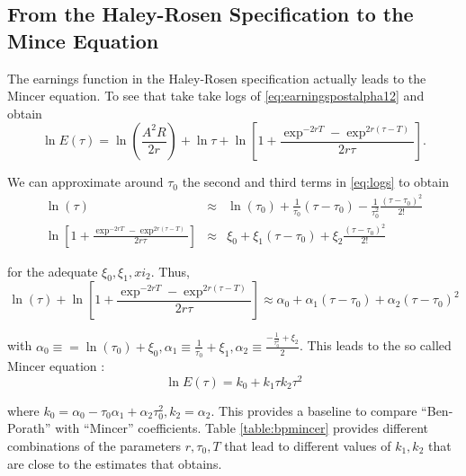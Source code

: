 \subsection{From the Haley-Rosen Specification to the Mince Equation}
The earnings function in the Haley-Rosen specification actually leads to the Mincer equation. To see that take take logs of \eqref{eq:earningspostalpha12} and obtain
\begin{equation}
\ln E(\tau) = \ln \left( \frac{A^2 R}{ 2r} \right) + \ln \tau + \ln \left[ 1 + \frac{\exp^{-2rT} - \exp^{2r(\tau - T)} }{2r \tau} \right]. \label{eq:logs}
\end{equation}

\indent We can approximate around $\tau_{0}$ the second and third terms in \eqref{eq:logs} to obtain
\begin{eqnarray}
\ln(\tau) &\approx& \ln (\tau_{0}) + \frac{1}{\tau_{0}} \left( \tau - \tau_{0} \right) - \frac{1}{\tau_{0}^2} \frac{\left( \tau - \tau_{0} \right)^2}{2!} \nonumber \\
\ln \left[ 1 + \frac{\exp^{-2rT} - \exp^{2r(\tau - T)} }{2r \tau} \right] &\approx& \xi_{0} + \xi_{1} \left( \tau - \tau_{0} \right) + \xi_{2} \frac{\left( \tau - \tau_{0} \right)^2}{2!}
\end{eqnarray}

\noindent for the adequate $\xi_{0}, \xi_{1}, xi_{2}$. Thus,
\begin{equation}
\ln(\tau) + \ln \left[ 1 + \frac{\exp^{-2rT} - \exp^{2r(\tau - T)} }{2r \tau} \right] \approx \alpha_{0} + \alpha_{1}\left( \tau - \tau_{0} \right) + \alpha_{2} \left( \tau - \tau_{0} \right)^2
\end{equation}

\noindent with $\alpha_{0} \equiv = \ln(\tau_{0}) + \xi_{0}, \alpha_{1} \equiv \frac{1}{\tau_{0}} + \xi_{1}, \alpha_{2} \equiv \frac{-\frac{1}{\tau_{0}^2} + \xi_{2}}{2}$. This leads to the so called Mincer equation \citep[see][]{mincer1974schooling}:
\begin{equation}
\ln E(\tau) = k_{0} + k_{1} \tau k_{2} \tau^2 \label{eq:mincer}
\end{equation}

\noindent where $k_{0} = \alpha_{0} - \tau_{0} \alpha_{1} + \alpha_{2} \tau_{0}^2, k_{2} = \alpha_{2}$. This provides a baseline to compare ``Ben-Porath'' with ``Mincer'' coefficients. Table \ref{table:bpmincer} provides different combinations of the parameters $r, \tau_{0}, T$ that lead to different values of $k_{1}, k_{2}$ that are close to the estimates that \citet{mincer1974schooling} obtains.

